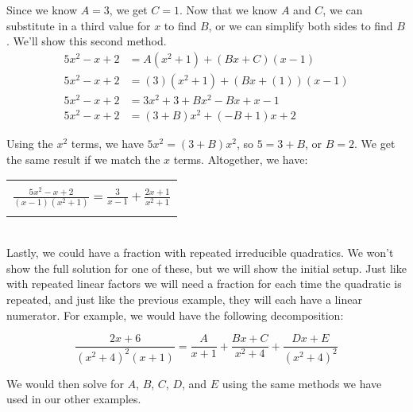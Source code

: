 {Since we know $A=3$, we get $C=1$. Now that we know $A$ and $C$, we can substitute in a third value for $x$ to find $B$, or we can simplify both sides to find $B$. We'll show this second method.
\begin{equation*}
	\begin{split}
		5x^2-x+2 &= A(x^2+1) + (Bx+C)(x-1) \\
		5x^2-x+2 &= (3)(x^2+1) + (Bx+(1))(x-1) \\
		5x^2-x+2 & = 3x^2+3 + Bx^2 - Bx +x -1 \\
		5x^2-x+2 &= (3+B)x^2 + (-B+1)x + 2
	\end{split}
\end{equation*}

Using the $x^2$ terms, we have $5x^2 = (3+B)x^2$, so $5=3+B$, or $B=2$. We get the same result if we match the $x$ terms. Altogether, we have:
	\begin{center}
		\begin{tabular}{| c |} \hline
			\\[-4pt]
			$\displaystyle \frac{5x^2-x+2}{(x-1)(x^2+1)} = \frac{3}{x-1} + \frac{2x+1}{x^2+1}$ \\[-4pt]
			\\\hline
		\end{tabular}
	\end{center}}\\

Lastly, we could have a fraction with repeated irreducible quadratics. We won't show the full solution for one of these, but we will show the initial setup. Just like with repeated linear factors we will need a fraction for each time the quadratic is repeated, and just like the previous example, they will each have a linear numerator. For example, we would have the following decomposition:

\begin{equation*}
	\frac{2x+6}{(x^2+4)^2(x+1)} = \frac{A}{x+1} + \frac{Bx+C}{x^2+4} + \frac{Dx+E}{(x^2+4)^2}
\end{equation*}

We would then solve for $A$, $B$, $C$, $D$, and $E$ using the same methods we have used in our other examples.


